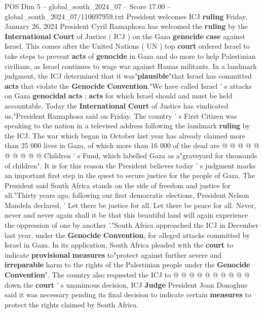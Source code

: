 \begin{textsample}{POS Dim 5 – global\_south\_2024\_07 – Score 17.00 – global\_south\_2024\_07/110697959.txt}  \label{ex:f5_pos_162}
President welcomes ICJ \textbf{ruling} Friday, January 26, 2024 President Cyril Ramaphosa has welcomed the \textbf{ruling} by the \textbf{International} \textbf{Court} of Justice ( ICJ ) on the Gaza \textbf{genocide} \textbf{case} against Israel.
This comes after the United Nations ( UN ) top \textbf{court} ordered Israel to take steps to prevent \textbf{acts} of \textbf{genocide} in Gaza and do more to help Palestinian civilians, as Israel continues to wage war against Hamas militants.
In a landmark judgment, the ICJ determined that it was"\textbf{plausible}"that Israel has committed \textbf{acts} that violate the \textbf{Genocide} \textbf{Convention}."We have called Israel ' s attacks on Gaza \textbf{genocidal} \textbf{acts} ; \textbf{acts} for which Israel should and must be held accountable.
Today the \textbf{International} \textbf{Court} of Justice has vindicated us,"President Ramaphosa said on Friday.
The country ' s First Citizen was speaking to the nation in a televised address following the landmark \textbf{ruling} by the ICJ.
The war which began in October last year has already claimed more than 25 000 lives in Gaza, of which more than 16 000 of the dead are @ @ @ @ @ @ @ @ @ @ Children ' s Fund, which labelled Gaza as a"graveyard for thousands of children".
It is for this reason the President believes today ' s judgment marks an important first step in the quest to secure justice for the people of Gaza.
The President said South Africa stands on the side of freedom and justice for all."Thirty years ago, following our first democratic elections, President Nelson Mandela declared, ' Let there be justice for all.
Let there be peace for all.
Never, never and never again shall it be that this beautiful land will again experience the oppression of one by another '."South Africa approached the ICJ in December last year, under the \textbf{Genocide} \textbf{Convention}, for alleged attacks committed by Israel in Gaza.
In its application, South Africa pleaded with the \textbf{court} to indicate \textbf{provisional} \textbf{measures} to"protect against further severe and \textbf{irreparable} harm to the rights of the Palestinian people under the \textbf{Genocide} \textbf{Convention}".
The country also requested the ICJ to @ @ @ @ @ @ @ @ @ @ down the \textbf{court} ' s unanimous decision, ICJ \textbf{Judge} President Joan Donoghue said it was necessary pending its final decision to indicate certain \textbf{measures} to protect the rights claimed by South Africa.

\end{textsample}
